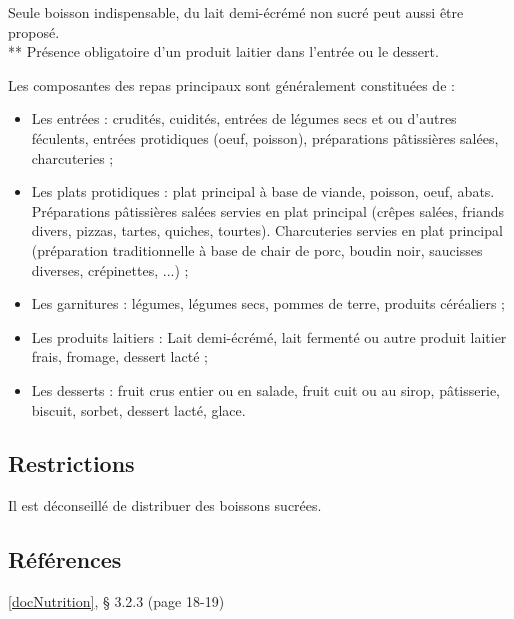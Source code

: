 \noindent * Seule boisson indispensable, du lait demi-écrémé non sucré peut aussi être proposé. \\
** Présence obligatoire d'un produit laitier dans l'entrée ou le dessert.

\vspace{0.5cm}

Les composantes des repas principaux sont généralement constituées de : 
\begin{itemize}
	\item Les entrées : crudités, cuidités, entrées de légumes secs et ou d’autres féculents, entrées protidiques (oeuf, poisson), préparations pâtissières salées, charcuteries ;
	\item Les plats protidiques : plat principal à base de viande, poisson, oeuf, abats. Préparations pâtissières salées servies en plat principal (crêpes salées, friands divers, pizzas, tartes, quiches, tourtes). Charcuteries servies en plat principal (préparation traditionnelle à base de chair de porc, boudin noir, saucisses diverses, crépinettes, ...) ;
	\item Les garnitures : légumes, légumes secs, pommes de terre, produits céréaliers ;
	\item Les produits laitiers : Lait demi-écrémé, lait fermenté ou autre produit laitier frais, fromage, dessert lacté ;
	\item Les desserts : fruit crus entier ou en salade, fruit cuit ou au sirop, pâtisserie, biscuit, sorbet, dessert lacté, glace.
\end{itemize}

\subsection{Restrictions}

Il est déconseillé de distribuer des boissons sucrées.

\subsection{Références}

\ref{docNutrition}, § 3.2.3 (page 18-19)